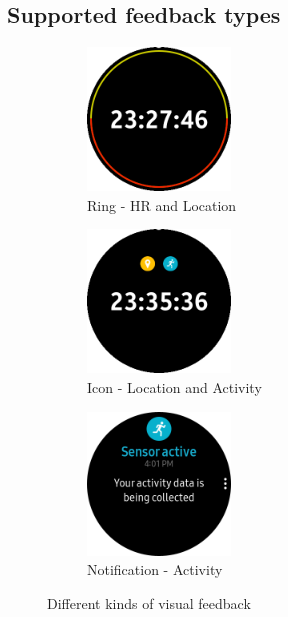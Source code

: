 \documentclass[conference, a4paper, 10pt, twocolumn]{IEEEtran}
\begin{document}
\subsection{Supported feedback types}

\begin{figure}[t!]
    \centering
    \begin{subfigure}[t]{0.33\textwidth}
        \centering
        \includegraphics[height=1.5in]{img/ringHR&Location.png}
        \caption{Ring - HR and Location}
        \label{fig:ringFeedback}
    \end{subfigure}%
    \begin{subfigure}[t]{0.33\textwidth}
        \centering
        \includegraphics[height=1.5in]{img/iconLocation&Activity.png}
        \caption{Icon - Location and Activity}
        \label{fig:iconFeedback}
    \end{subfigure}
    \begin{subfigure}[t]{0.33\textwidth}
        \centering
        \includegraphics[height=1.5in]{img/notificationActifity.png}
        \caption{Notification - Activity}
        \label{fig:notificationFeedback}
    \end{subfigure}
    \caption{Different kinds of visual feedback}
    \label{fig:visualFeedbackImage}
\end{figure}
\end{document}
